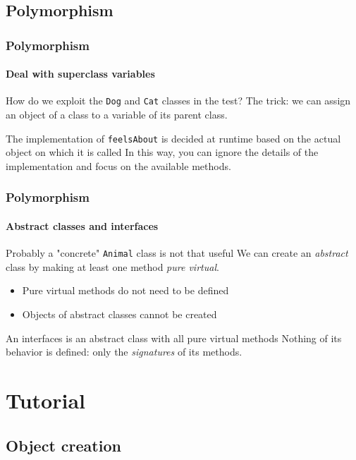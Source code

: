 \subsection{Polymorphism}

\begin{frame}
\frametitle{Polymorphism}
\framesubtitle{Deal with superclass variables}

\begin{block}{How do we exploit the \texttt{Dog} and \texttt{Cat} classes in the test?}
The trick: we can assign an object of a class to a variable of its parent class.
\end{block}
\pause
\begin{block}{The implementation of \texttt{feelsAbout} is decided at runtime based on the actual object on which it is called}
In this way, you can ignore the details of the implementation and focus on the available methods.
\end{block}

\end{frame}

\begin{frame}
\frametitle{Polymorphism}
\framesubtitle{Abstract classes and interfaces}

\begin{block}{Probably a "concrete" \texttt{Animal} class is not that useful}
We can create an {\em abstract} class by making at least one method {\em pure virtual}.
\begin{itemize}
\item Pure virtual methods do not need to be defined
\item Objects of abstract classes cannot be created
\end{itemize}
\end{block}
\pause
\begin{block}{An interfaces is an abstract class with all pure virtual methods}
Nothing of its behavior is defined: only the {\em signatures} of its methods.
\end{block}

\end{frame}

\section{Tutorial}

\subsection{Object creation}

